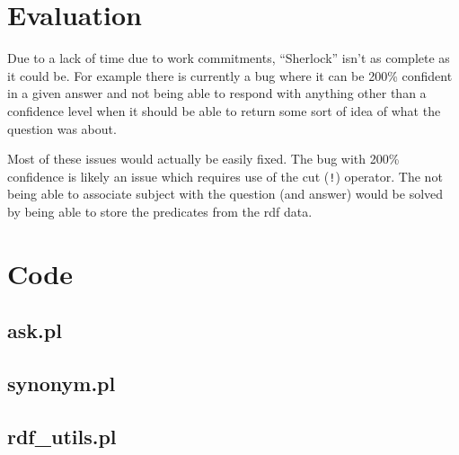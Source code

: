 \documentclass[11pt,a4paper]{report}
\begin{document}
\chapter{Evaluation}
Due to a lack of time due to work commitments, ``Sherlock'' isn't as complete as it 
could be. For example there is currently a bug where it can be 200\% confident in a
given answer and not being able to respond with anything other than a confidence 
level when it should be able to return some sort of idea of what the question was
about.

Most of these issues would actually be easily fixed. The bug with 200\% confidence is
likely an issue which requires use of the cut (\verb+!+) operator. The not being able
to associate subject with the question (and answer) would be solved by being able to
store the predicates from the \gls{rdf} data.

\chapter{Code}
\section{ask.pl}

\newpage

\section{synonym.pl}

\newpage

\section{rdf\_utils.pl}




\end{document}
